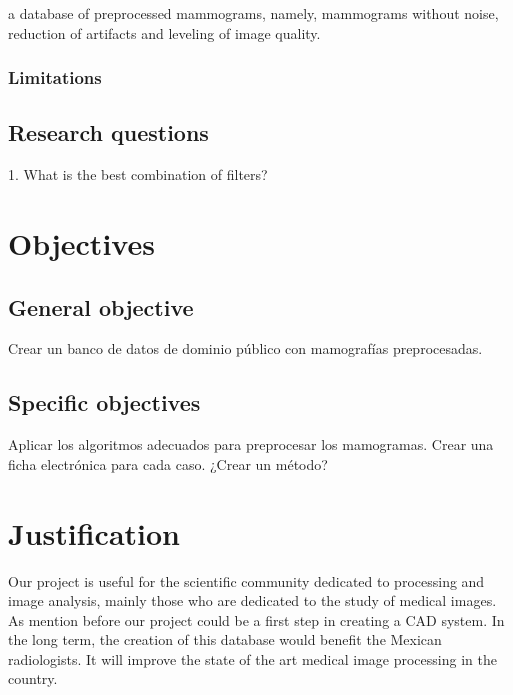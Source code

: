 a database of preprocessed mammograms, namely, mammograms without noise,
reduction of artifacts and leveling of image quality.

\subsubsection{Limitations}

\subsection{Research questions}

1. What is the best combination of filters?

\section{Objectives}
\subsection{General objective}

Crear un banco de datos de dominio público con mamografías preprocesadas.

\subsection{Specific objectives}

Aplicar los algoritmos adecuados para preprocesar los mamogramas.
Crear una ficha electrónica para cada caso.
¿Crear un método?

\section{Justification}

Our project is useful for the scientific community dedicated to processing and
image analysis, mainly those who are dedicated to the study of medical images.
As mention before our project could be a first step in creating a CAD system.
In the long term, the creation of this database would benefit the Mexican
radiologists. It will improve the state of the art medical image processing in
the country.

